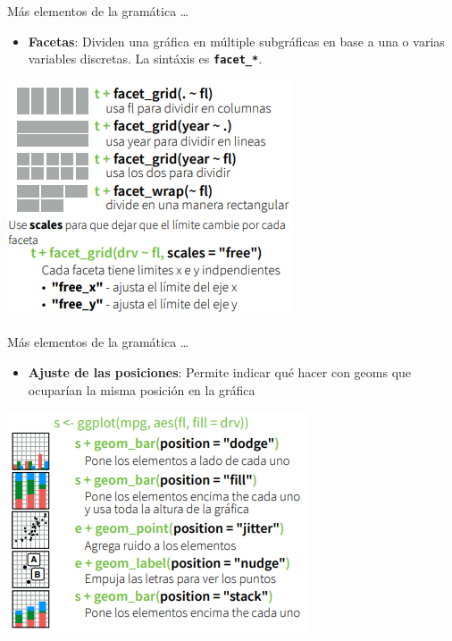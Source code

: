 \documentclass[
  ignorenonframetext,
  aspectratio=169]{beamer}
\providecommand{\tightlist}{%
  \setlength{\itemsep}{0pt}\setlength{\parskip}{0pt}}
\begin{document}
\begin{frame}[fragile]{Más elementos de la gramática \ldots{}}
\protect\hypertarget{muxe1s-elementos-de-la-gramuxe1tica-3}{}
\begin{itemize}
\tightlist
\item
  \textbf{Facetas}: Dividen una gráfica en múltiple subgráficas en base
  a una o varias variables discretas. La sintáxis es
  \textbf{\texttt{facet\_*}}.
\end{itemize}

\begin{center}\includegraphics[width=0.4\linewidth,height=0.5\textheight]{Imgs/facetas} \end{center}
\end{frame}

\begin{frame}{Más elementos de la gramática \ldots{}}
\protect\hypertarget{muxe1s-elementos-de-la-gramuxe1tica-4}{}
\begin{itemize}
\tightlist
\item
  \textbf{Ajuste de las posiciones}: Permite indicar qué hacer con geoms
  que ocuparían la misma posición en la gráfica
\end{itemize}

\begin{center}\includegraphics[width=0.4\linewidth,height=0.5\textheight]{Imgs/posicion} \end{center}
\end{frame}
\end{document}
